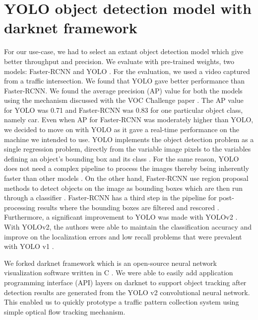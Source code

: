\documentclass[conference]{IEEEtran}
\begin{document}
\section{YOLO object detection model with darknet framework}\label{sec.yolo}
For our use-case, we had to select an extant object detection model which give better throughput and precision.
We evaluate with pre-trained weights, two models: Faster-RCNN \cite{Faster-RCNN} and YOLO \cite{YOLO_v1, YOLO_v2}.
For the evaluation, we used a video captured from a traffic intersection.
We found that YOLO gave better performance than Faster-RCNN.
We found the average precision ({AP}) value for both the models using the mechanism discussed with the VOC Challenge paper \cite[p.~314]{VOC_challenge}.
The {AP} value for YOLO was {0.71} and Faster-RCNN was {0.83} for one particular object class, namely car.
Even when {AP} for Faster-RCNN was moderately higher than YOLO, we decided to move on with YOLO as it gave a real-time performance on the machine we intended to use.
YOLO implements the object detection problem as a single regression problem, directly from the variable image pixels to the variables defining an object's bounding box and its class \cite[p.~1]{YOLO_v1}. 
For the same reason, YOLO does not need a complex pipeline to process the images thereby being inherently faster than other models \cite[p.~1]{YOLO_v1}.
On the other hand, Faster-RCNN use region proposal methods to detect objects on the image as bounding boxes which are then run through a classifier \cite[p.~1]{YOLO_v1}. 
Faster-RCNN has a third step in the pipeline for post-processing results where the bounding boxes are filtered and rescored \cite[p.~1]{YOLO_v1}.
Furthermore, a significant improvement to YOLO \cite{YOLO_v1} was made with YOLOv2 \cite{YOLO_v2}.
With YOLOv2, the authors were able to maintain the classification accuracy and improve on the localization errors and low recall problems that were prevalent with YOLO v1 \cite[Sec.~2]{YOLO_v2}.

We forked darknet framework which is an open-source neural network visualization software written in C \cite{darknet}.
We were able to easily add application programming interface (API) layers on darknet to support object tracking after detection results are generated from the YOLO v2 convolutional neural network.
This enabled us to quickly prototype a traffic pattern collection system using simple optical flow tracking mechanism.
\end{document}
